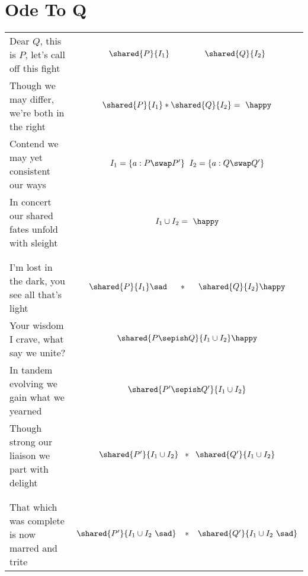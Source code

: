 \clearpage\chapter{Ode To Q}
\begin{tabular}{l @{} c}
Dear $Q$, this is $P$, let's call off this fight
& $\shared{P}{I_1} \hspace*{1.5cm} \shared{Q}{I_2}$\vspace*{2pt}\\

Though we may differ, we're both in the right &$\shared{P}{I_1} * \shared{Q}{I_2} =\ \happy $\vspace*{2pt}
\\

Contend we may yet consistent our ways 
&$I_1 = \{a : P \swap P'\} \;\; I_2 = \{a: Q \swap Q'\}$\vspace*{2pt}\\

In concert our shared fates unfold with sleight&
 $I_1 \cup I_2 =\ \happy$ \\\\\\


I'm lost in the dark, you see all that's light
&$\shared{P}{I_1} \sad \hspace*{0.5cm} * \hspace*{0.5cm}  \shared{Q}{I_2} \happy$\vspace*{2pt}\\

Your wisdom I crave, what say we unite? 
&$\shared{P \sepish Q}{I_1 \cup I_2} \happy$\vspace*{2pt}\\

In tandem evolving we gain what we yearned 
&$\shared{P' \sepish Q'}{I_1 \cup I_2} $\vspace*{2pt}\\

Though strong our liaison we part with delight
&$\shared{P'}{I_1 \cup I_2} \;\; *\;\;  \shared{Q'}{I_1 \cup I_2} $\\\\\\


That which was complete is now marred and trite
& $\shared{P'}{I_1 \cup I_2\ \sad}  \;\;\; * \;\;\;  \shared{Q'}{I_1 \cup I_2\ \sad} $\vspace*{2pt}\\


\end{tabular}
